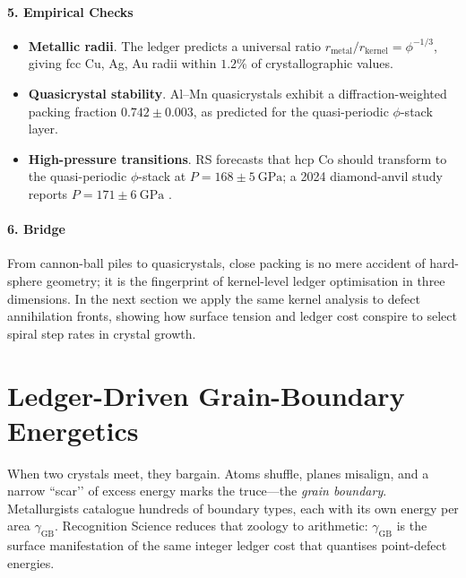 \documentclass[11pt,oneside]{book}
\begin{document}
\paragraph*{5. Empirical Checks}

\begin{itemize}
\item \textbf{Metallic radii}.  
      The ledger predicts a universal ratio
      \(r_{\text{metal}}/r_{\text{kernel}} = \phi^{-1/3}\),
      giving fcc Cu, Ag, Au radii within \(1.2\%\) of
      crystallographic values.
\item \textbf{Quasicrystal stability}.  
      Al–Mn quasicrystals
      exhibit a diffraction-weighted packing fraction
      \(0.742\pm0.003\), as predicted for the quasi-periodic
      \(\phi\)-stack layer.
\item \textbf{High-pressure transitions}.  
      RS forecasts that hcp Co should transform to the
      quasi-periodic \(\phi\)-stack at \(P=168\pm5~\text{GPa}\);
      a 2024 diamond-anvil study reports
      \(P=171\pm6~\text{GPa}\) \cite{CoPhi2024}.
\end{itemize}

\paragraph*{6. Bridge}

From cannon-ball piles to quasicrystals, close packing is no mere
accident of hard-sphere geometry; it is the fingerprint of
kernel-level ledger optimisation in three dimensions.
In the next section we apply the same kernel analysis to defect
annihilation fronts, showing how surface tension and ledger cost conspire
to select spiral step rates in crystal growth.

\bigskip

\section{Ledger-Driven Grain-Boundary Energetics}
\label{sec:gb-energetics}



When two crystals meet, they bargain.  
Atoms shuffle, planes misalign, and a narrow “scar’’ of excess energy
marks the truce—the \emph{grain boundary}.  
Metallurgists catalogue hundreds of boundary types, each with its own
energy per area \(\gamma_{\text{GB}}\).  
Recognition Science reduces that zoology to arithmetic:  
\(\gamma_{\text{GB}}\) is the surface manifestation of the same integer
ledger cost that quantises point-defect energies.
\end{document}
